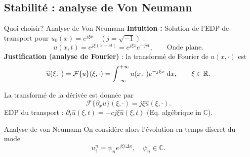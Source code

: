 \documentclass[aspectratio=169, french]{beamer}
\newcommand{\bbR}{\mathbb{R}}
\newcommand{\bbC}{\mathbb{C}}
\begin{document}
\subsection{Stabilité : analyse de Von Neumann}


\begin{frame}{Quoi choisir? Analyse de Von Neumann}
	\textbf{Intuition : } Solution de l'EDP de transport pour $u_0(x) = e^{j \xi x} \quad (j = \sqrt{-1})$ :
	\begin{equation*}
	u(x, t) = e^{j \xi(x-ct)} = e^{j \xi x}e^{-jct}, \qquad \text{Onde plane.}
	\end{equation*}
	\textbf{Justification (analyse de Fourier)} :  la transformé de Fourier de $u(x, \cdot)$ est
	\begin{equation*}
		\widehat{u}(\xi, \cdot) = \mathcal{F}\{u\}(\xi, \cdot) = \int_{-\infty}^{+\infty} u(x, \cdot)e^{- j \xi x}  \d{x}, \qquad \xi \in \bbR.
	\end{equation*}

La transformé de la dérivée est donnée par
\begin{equation*}
\mathcal{F}\{\partial_{x} u\}(\xi, \cdot) = j \xi \widehat{u}(\xi, \cdot).
\end{equation*}
EDP du transport : $\partial_t{\widehat{u}}(\xi, t) = -c  j  \xi \widehat{u}(\xi, t)$ \hspace{.3cm} (Eq. algébrique in $\bbC$).
\begin{block}{Analyse de von Neumann}
		On considère alors l'évolution en temps discret du mode
		\begin{equation*}
			u_i^n = \psi_n e^{\, j \xi  i  \Delta x}, \quad \psi_n \in \bbC.
		\end{equation*}
\end{block}
\end{frame}
\end{document}

